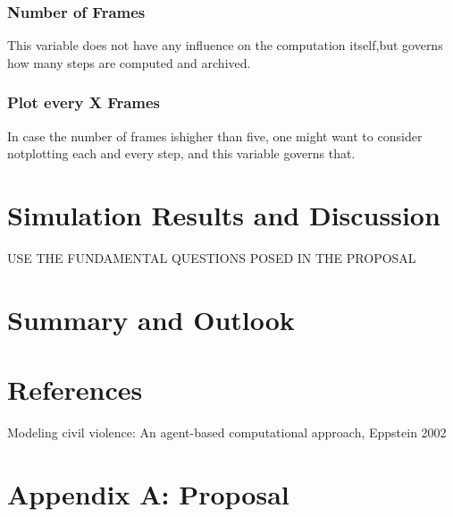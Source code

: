 \documentclass[11pt]{article}
\begin{document}
\subsubsection{Number of Frames}
This variable does not have any influence on the computation itself,but governs how many steps are computed and archived.

\subsubsection{Plot every X Frames}
In case the number of frames ishigher than five, one might want to consider notplotting each and every step, and this variable governs that.

\newpage

\section{Simulation Results and Discussion}

USE THE FUNDAMENTAL QUESTIONS POSED IN THE PROPOSAL

\newpage

\section{Summary and Outlook}

\newpage

\section{References}

Modeling civil violence: An agent-based computational approach, Eppstein 2002

\section{Appendix A: Proposal}
\end{document}
